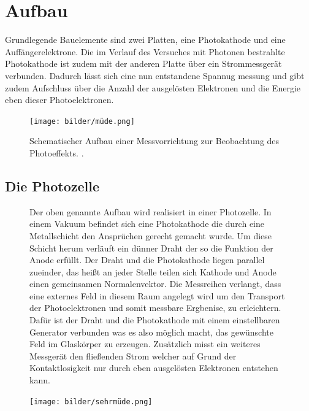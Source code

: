 \section{Aufbau}
Grundlegende Bauelemente sind zwei Platten, eine Photokathode und eine Auffängerelektrone.
Die im Verlauf des Versuches mit Photonen bestrahlte Photokathode ist zudem mit der anderen Platte über ein Strommessgerät verbunden.
Dadurch lässt sich eine nun entstandene Spannug messung und gibt zudem Aufschluss über die Anzahl der ausgelösten Elektronen 
und die Energie eben dieser Photoelektronen.

\begin{figure}
    \centering
    \texttt{[image: bilder/müde.png]}
    \caption{Schematischer Aufbau einer Messvorrichtung zur Beobachtung des Photoeffekts. \cite{skript}.} 
    \label{fig:müde}
\end{figure}
\subsection{Die Photozelle}
\begin{figure}
    \begin{minipage}{0.5\textwidth}
Der oben genannte Aufbau wird realisiert in einer Photozelle. In einem Vakuum befindet sich eine Photokathode die durch 
eine Metallschicht den Ansprüchen gerecht gemacht wurde. Um diese Schicht herum verläuft ein dünner Draht der so die Funktion der Anode 
erfüllt. Der Draht und die Photokathode liegen parallel zueinder, das heißt an jeder Stelle teilen sich Kathode und Anode einen gemeinsamen Normalenvektor.
Die Messreihen verlangt, dass eine externes Feld in diesem Raum angelegt wird um den Transport der Photoelektronen und somit 
messbare Ergbenise, zu erleichtern.  Dafür ist der Draht und die Photokathode mit einem einstellbaren Generator verbunden was es also möglich macht, 
das gewünschte Feld im Glaskörper zu erzeugen. Zusätzlich misst ein weiteres Messgerät den fließenden Strom welcher auf Grund 
der Kontaktlosigkeit nur durch eben ausgelösten Elektronen entstehen kann. 
     \end{minipage}
\hfill
    \begin{minipage}{0.5\textwidth}
        \centering
        \texttt{[image: bilder/sehrmüde.png]}
        \captionsetup{justification=centering}
    \label{fig:sehrmüde}
    \end{minipage}
\end{figure}

